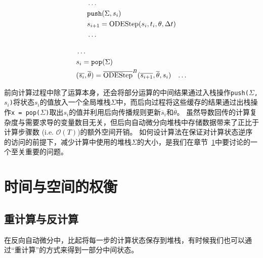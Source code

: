 \documentclass[A4,twoside,fontset=ubuntu,UTF8]{ctexart}
\newcommand{\bigO}{{\mathcal{O}}}
\begin{document}
\begin{minipage}{0.45\textwidth}
\begin{align*}
    &\ldots\\
    &\texttt{push}(\Sigma, s_i)\\
    &s_{i+1} = {\rm ODEStep}(s_{i}, t_i, \theta, \Delta t)\\
    &\ldots
\end{align*}
\end{minipage}
\begin{minipage}{0.45\textwidth}
\begin{align*}
    &\ldots\\
    &s_{i} = \texttt{pop}(\Sigma)\\
    &(\overline{s_i}, \overline{\theta}) = \overline{\rm ODEStep}^B(\overline{s_{i+1}}, \overline{\theta},s_i)
    &\ldots
\end{align*}
\end{minipage}

前向计算过程中除了运算本身，还会将部分运算的中间结果通过入栈操作\texttt{push($\Sigma$,$s_i$)}将状态$s_i$的值放入一个全局堆栈$\Sigma$中，而后向过程将这些缓存的结果通过出栈操作\texttt{x = pop($\Sigma$)}取出$s_i$的值并利用后向传播规则更新$\overline s_i$和$\overline \theta$。
虽然导数回传的计算复杂度与需要求导的变量数目无关，但后向自动微分向堆栈中存储数据带来了正比于计算步骤数 (i.e. $\bigO(T)$)的额外空间开销。
如何设计算法在保证对计算状态逆序的访问的前提下，减少计算中使用的堆栈$\Sigma$的大小，是我们在章节~\ref{sec:timespace}中要讨论的一个至关重要的问题。

\section{时间与空间的权衡}\label{sec:timespace}
\subsection{重计算与反计算}
在反向自动微分中，比起将每一步的计算状态保存到堆栈，有时候我们也可以通过“重计算”的方式来得到一部分中间状态。
\end{document}
